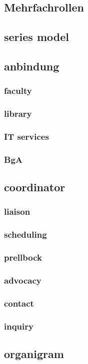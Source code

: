 \documentclass[output=guidelines,guidelines] {langscibook}
\begin{document}
\subsection{Mehrfachrollen}
\subsection{series model}
\subsection{anbindung}
\subsubsection{faculty}
\subsubsection{library}
\subsubsection{IT services}
\subsubsection{BgA}
\subsection{coordinator}
\subsubsection{liaison}
\subsubsection{scheduling}
\subsubsection{prellbock}
\subsubsection{advocacy}
\subsubsection{contact}
\subsubsection{inquiry}
\subsection{organigram}
\end{document}
